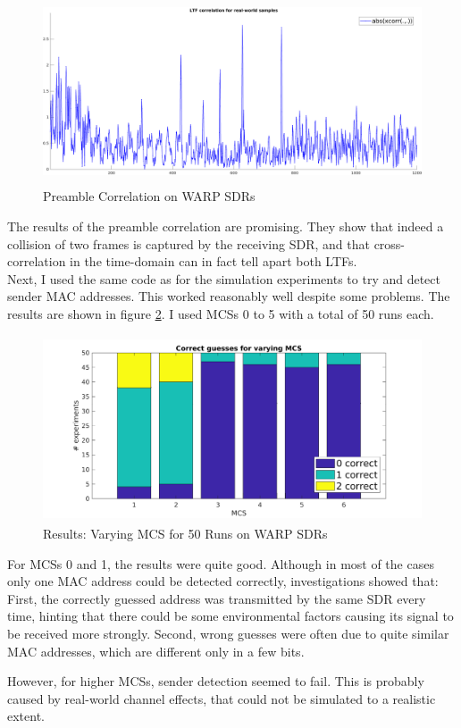 \begin{figure}[H]
	\centering
  \includegraphics[height=5.5cm]{gfx/plots/warp-preamble}
	\caption{Preamble Correlation on WARP SDRs}
	\label{fig:warp_preamble_corr}
\end{figure}

The results of the preamble correlation are promising. They show that indeed a collision of two frames is captured by the receiving \gls{SDR}, and that cross-correlation in the time-domain can in fact tell apart both \glspl{LTF}.\\

Next, I used the same code as for the simulation experiments to try and detect sender \gls{MAC} addresses. This worked reasonably well despite some problems. The results are shown in figure \ref{fig:warp-mcs-results}. I used \glspl{MCS} 0 to 5 with a total of 50 runs each.

\begin{figure}[H]
	\centering
	\includegraphics[height=5.5cm]{gfx/plots/warp-mcs}
	\caption{Results: Varying MCS for 50 Runs on WARP SDRs}
	\label{fig:warp-mcs-results}
\end{figure}

For \glspl{MCS} 0 and 1, the results were quite good. Although in most of the cases only one \gls{MAC} address could be detected correctly, investigations showed that: First, the correctly guessed address was transmitted by the same \gls{SDR} every time, hinting that there could be some environmental factors causing its signal to be received more strongly. Second, wrong guesses were often due to quite similar \gls{MAC} addresses, which are different only in a few bits.

However, for higher \glspl{MCS}, sender detection seemed to fail. This is probably caused by real-world channel effects, that could not be simulated to a realistic extent.
